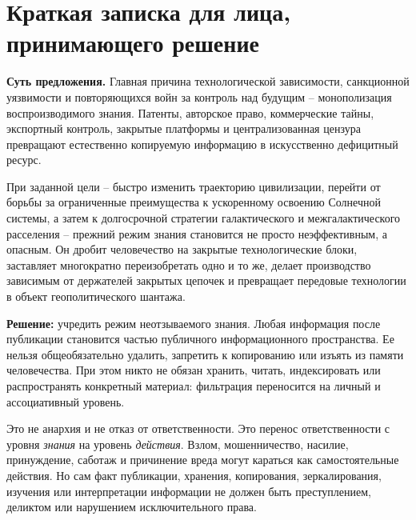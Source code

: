 \documentclass[11pt,a4paper]{article}
\begin{document}
\tableofcontents
\clearpage
{}

\section*{Краткая записка для лица, принимающего решение}

\begin{executivebox}
\textbf{Суть предложения.} Главная причина технологической зависимости, санкционной уязвимости и повторяющихся войн за контроль над будущим -- монополизация воспроизводимого знания. Патенты, авторское право, коммерческие тайны, экспортный контроль, закрытые платформы и централизованная цензура превращают естественно копируемую информацию в искусственно дефицитный ресурс.
\end{executivebox}

При заданной цели -- быстро изменить траекторию цивилизации, перейти от борьбы за ограниченные преимущества к ускоренному освоению Солнечной системы, а затем к долгосрочной стратегии галактического и межгалактического расселения -- прежний режим знания становится не просто неэффективным, а опасным. Он дробит человечество на закрытые технологические блоки, заставляет многократно переизобретать одно и то же, делает производство зависимым от держателей закрытых цепочек и превращает передовые технологии в объект геополитического шантажа.

\textbf{Решение:} учредить режим неотзываемого знания. Любая информация после публикации становится частью публичного информационного пространства. Ее нельзя общеобязательно удалить, запретить к копированию или изъять из памяти человечества. При этом никто не обязан хранить, читать, индексировать или распространять конкретный материал: фильтрация переносится на личный и ассоциативный уровень.

Это не анархия и не отказ от ответственности. Это перенос ответственности с уровня \emph{знания} на уровень \emph{действия}. Взлом, мошенничество, насилие, принуждение, саботаж и причинение вреда могут караться как самостоятельные действия. Но сам факт публикации, хранения, копирования, зеркалирования, изучения или интерпретации информации не должен быть преступлением, деликтом или нарушением исключительного права.
\end{document}

